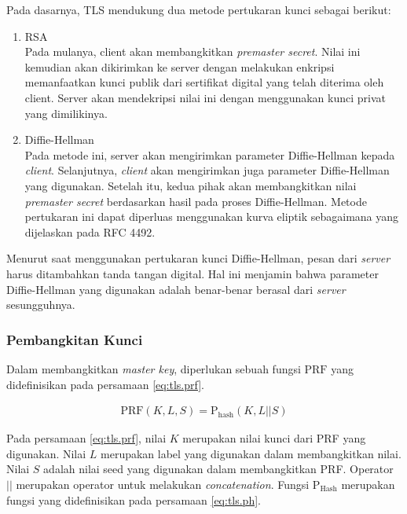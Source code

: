 Pada dasarnya, TLS mendukung dua metode pertukaran kunci sebagai berikut:
\begin{enumerate}
  \item RSA\\
  Pada mulanya, client akan membangkitkan \emph{premaster secret}. Nilai ini kemudian akan dikirimkan ke server dengan melakukan enkripsi memanfaatkan kunci publik dari sertifikat digital yang telah diterima oleh client. Server akan mendekripsi nilai ini dengan menggunakan kunci privat yang dimilikinya.

  \item Diffie-Hellman\\
  Pada metode ini, server akan mengirimkan parameter Diffie-Hellman kepada \emph{client}. Selanjutnya, \emph{client} akan mengirimkan juga parameter Diffie-Hellman yang digunakan. Setelah itu, kedua pihak akan membangkitkan nilai \emph{premaster secret} berdasarkan hasil pada proses Diffie-Hellman. Metode pertukaran ini dapat diperluas menggunakan kurva eliptik sebagaimana yang dijelaskan pada RFC 4492. 
\end{enumerate}

Menurut \textcite{rfc5246} saat menggunakan pertukaran kunci Diffie-Hellman, pesan dari \emph{server} harus ditambahkan tanda tangan digital. Hal ini menjamin bahwa parameter Diffie-Hellman yang digunakan adalah benar-benar berasal dari \emph{server} sesungguhnya. 

\subsubsection{Pembangkitan Kunci}
Dalam membangkitkan \emph{master key}, diperlukan sebuah fungsi $\text{PRF}$ yang didefinisikan pada persamaan \ref{eq:tls.prf}.

\begin{equation}
  \label{eq:tls.prf}
  \begin{array}{l}   
    \text{PRF}(K, L, S) = \text{P}_\text{hash}(K, L || S)
  \end{array}
\end{equation}

Pada persamaan \ref{eq:tls.prf}, nilai $K$ merupakan nilai kunci dari PRF yang digunakan. Nilai $L$ merupakan label yang digunakan dalam membangkitkan nilai. Nilai $S$ adalah nilai seed yang digunakan dalam membangkitkan PRF. Operator $||$ merupakan operator untuk melakukan \emph{concatenation}. Fungsi $\text{P}_\text{Hash}$ merupakan fungsi yang didefinisikan pada persamaan \ref{eq:tls.ph}.

